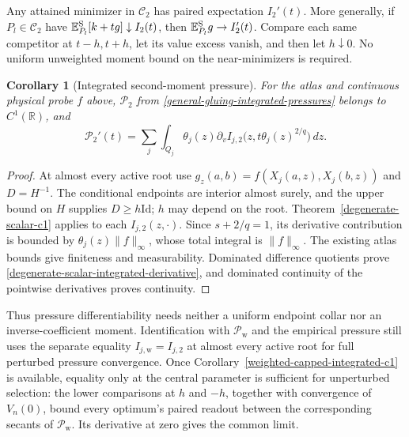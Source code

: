 \documentclass[11pt,reqno]{amsart}
\newtheorem{corollary}[theorem]{Corollary}
\theoremstyle{definition}
\theoremstyle{remark}
\numberwithin{equation}{section}
\newcommand{\R}{\mathbb R}
\newcommand{\E}{\mathbb E}
\begin{document}
Any attained minimizer in \(\mathcal C_2\) has paired expectation
\(I_2'(t)\). More generally, if \(P_l\in\mathcal C_2\) have
\(\E_{P_l}^{\rm S}[k+tg]\downarrow I_2(t)\), then
\(\E_{P_l}^{\rm S}g\to I_2'(t)\). Compare each same competitor
at \(t-h,t+h\), let its value excess vanish, and then let
\(h\downarrow0\). No uniform unweighted moment bound on the
near-minimizers is required.

\begin{corollary}[Integrated second-moment pressure]
\label{degenerate-scalar-integrated-c1}
For the atlas and continuous physical probe \(f\) above,
\(\mathcal P_2\) from \eqref{general-gluing-integrated-pressures}
belongs to \(C^1(\R)\), and
\begin{equation}
\label{degenerate-scalar-integrated-derivative}
 \mathcal P_2'(t)=\sum_j\int_{Q_j}\theta_j(z)
   \partial_v I_{j,2}\bigl(z,t\theta_j(z)^{2/q}\bigr)\,dz.
\end{equation}
\end{corollary}
\begin{proof}
At almost every active root use
\(g_z(a,b)=f(X_j(a,z),X_j(b,z))\) and \(D=H^{-1}\).
The conditional endpoints are interior almost surely, and the upper
bound on \(H\) supplies \(D\ge h\mathrm{Id}\); \(h\) may depend
on the root. Theorem~\ref{degenerate-scalar-c1} applies to each
\(I_{j,2}(z,\cdot)\). Since \(s+2/q=1\), its derivative
contribution is bounded by \(\theta_j(z)\|f\|_\infty\), whose
total integral is \(\|f\|_\infty\). The existing atlas bounds
give finiteness and measurability. Dominated difference quotients prove
\eqref{degenerate-scalar-integrated-derivative}, and dominated
continuity of the pointwise derivatives proves continuity.
\end{proof}

Thus pressure differentiability needs neither a uniform endpoint
collar nor an inverse-coefficient moment. Identification with
\(\mathcal P_{\mathrm w}\) and the empirical pressure still uses
the separate equality \(I_{j,\mathrm w}=I_{j,2}\) at almost every
active root for full perturbed pressure convergence.
Once Corollary~\ref{weighted-capped-integrated-c1} is available,
equality only at the central parameter is sufficient for unperturbed
selection: the lower comparisons at \(h\) and \(-h\), together with
convergence of \(V_n(0)\), bound every optimum's paired readout between
the corresponding secants of \(\mathcal P_{\mathrm w}\).
Its derivative at zero gives the common limit.

\end{document}
